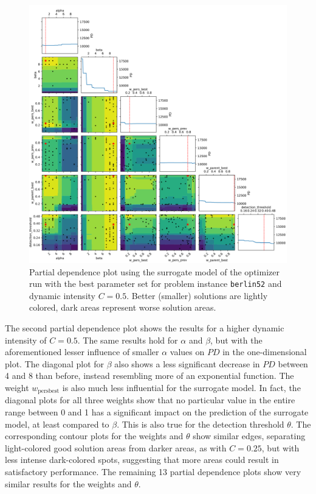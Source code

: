 \begin{figure}[h!]
	\centering
	\centerline{\includegraphics[width=1.2\textwidth]{results/part2/partial_dependence_berlin52_C_0.5_run_4.svg}}
	\caption[Partial dependence plot for \texttt{berlin52} and $C=0.5$]{Partial dependence plot using the surrogate model of the optimizer run with the best parameter set for problem instance \texttt{berlin52} and dynamic intensity $C=0.5$. Better (smaller) solutions are lightly colored, dark areas represent worse solution areas.}
	\label{fig:partial_dependence_berlin52_C_05}
\end{figure}

The second partial dependence plot shows the results for a higher dynamic intensity of $C=0.5$. 
The same results hold for $\alpha$ and $\beta$, but with the aforementioned lesser influence of smaller $\alpha$ values on $PD$ in the one-dimensional plot. The diagonal plot for $\beta$ also shows a less significant decrease in $PD$ between 4 and 8 than before, instead resembling more of an exponential function. The weight $w_{\text{persbest}}$ is also much less influential for the surrogate model. In fact, the diagonal plots for all three weights show that no particular value in the entire range between 0 and 1 has a significant impact on the prediction of the surrogate model, at least compared to $\beta$. This is also true for the detection threshold $\theta$. The corresponding contour plots for the weights and $\theta$ show similar edges, separating light-colored good solution areas from darker areas, as with $C=0.25$, but with less intense dark-colored spots, suggesting that more areas could result in satisfactory performance. The remaining 13 partial dependence plots show very similar results for the weights and $\theta$.


